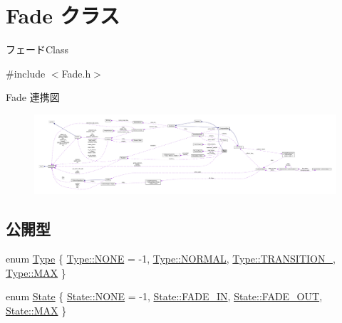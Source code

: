 \hypertarget{class_fade}{}\section{Fade クラス}
\label{class_fade}


フェード\+Class  




{\ttfamily \#include $<$Fade.\+h$>$}



Fade 連携図\nopagebreak
\begin{figure}[H]
\begin{center}
\leavevmode
\includegraphics[width=350pt]{class_fade__coll__graph}
\end{center}
\end{figure}
\subsection*{公開型}
\begin{DoxyCompactItemize}
\item 
enum \mbox{\hyperlink{class_fade_ac06f27215b454aa05b93c236476d6e80}{Type}} \{ \mbox{\hyperlink{class_fade_ac06f27215b454aa05b93c236476d6e80ab50339a10e1de285ac99d4c3990b8693}{Type\+::\+N\+O\+NE}} = -\/1, 
\mbox{\hyperlink{class_fade_ac06f27215b454aa05b93c236476d6e80a1e23852820b9154316c7c06e2b7ba051}{Type\+::\+N\+O\+R\+M\+AL}}, 
\mbox{\hyperlink{class_fade_ac06f27215b454aa05b93c236476d6e80a6d792d623461e0dcc819e2caacbe4e7e}{Type\+::\+T\+R\+A\+N\+S\+I\+T\+I\+O\+N\+\_}}, 
\mbox{\hyperlink{class_fade_ac06f27215b454aa05b93c236476d6e80a26a4b44a837bf97b972628509912b4a5}{Type\+::\+M\+AX}}
 \}
\item 
enum \mbox{\hyperlink{class_fade_ae77826bf3ff2ab95fb7b3b6f95cba80a}{State}} \{ \mbox{\hyperlink{class_fade_ae77826bf3ff2ab95fb7b3b6f95cba80aab50339a10e1de285ac99d4c3990b8693}{State\+::\+N\+O\+NE}} = -\/1, 
\mbox{\hyperlink{class_fade_ae77826bf3ff2ab95fb7b3b6f95cba80aa3ce542dfb80acd9d3ecc081f236950cf}{State\+::\+F\+A\+D\+E\+\_\+\+IN}}, 
\mbox{\hyperlink{class_fade_ae77826bf3ff2ab95fb7b3b6f95cba80aae5c4ab91cc2038893a3a99b567f13199}{State\+::\+F\+A\+D\+E\+\_\+\+O\+UT}}, 
\mbox{\hyperlink{class_fade_ae77826bf3ff2ab95fb7b3b6f95cba80aa26a4b44a837bf97b972628509912b4a5}{State\+::\+M\+AX}}
 \}
\end{DoxyCompactItemize}
